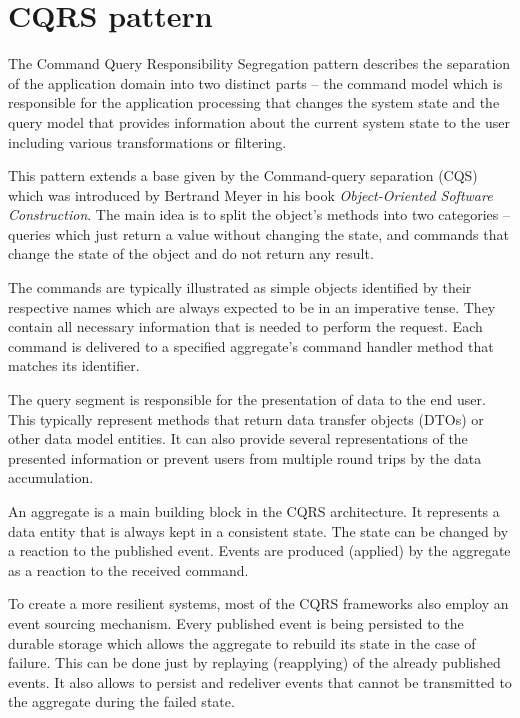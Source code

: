 \documentclass[oneside,
  digital, %
  table,   %
  lof,     %
  lot,     %
]{fithesis3}
\begin{document}



\appendix %

\clearpage
\chapter{CQRS pattern}
\label{sec:appendix-cqrs}

The Command Query Responsibility Segregation pattern describes the separation of the application domain into two distinct parts -- the command model which is responsible for the application processing that changes the system state and the query model that provides information about the current system state to the user including various transformations or filtering. 

This pattern extends a base given by the Command-query separation (CQS) which was introduced by Bertrand Meyer in his book \textit{Object-Oriented Software Construction}. The main idea is to split the object's methods into two categories -- queries which just return a value without changing the state, and commands that change the state of the object and do not return any result.

The commands are typically illustrated as simple objects identified by their respective names which are always expected to be in an imperative tense. They contain all necessary information that is needed to perform the request. Each command is delivered to a specified aggregate's command handler method that matches its identifier. 

The query segment is responsible for the presentation of data to the end user. This typically represent methods that return data transfer objects (DTOs) or other data model entities. It can also provide several representations of the presented information or prevent users from multiple round trips by the data accumulation.

An aggregate is a main building block in the CQRS architecture. It represents a data entity that is always kept in a consistent state. The state can be changed by a reaction to the published event. Events are produced (applied) by the aggregate as a reaction to the received command. 

To create a more resilient systems, most of the CQRS frameworks also employ an event sourcing mechanism. Every published event is being persisted to the durable storage which allows the aggregate to rebuild its state in the case of failure. This can be done just by replaying (reapplying) of the already published events. It also allows to persist and redeliver events that cannot be transmitted to the aggregate during the failed state.
\end{document}
